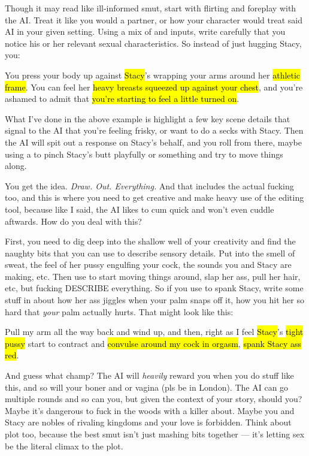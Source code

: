 \documentclass[Avsfag-main.tex]{subfiles}
\begin{document}
Though it may read like ill-informed smut, start with flirting and foreplay with the AI.
Treat it like you would a partner, or how your character would treat said AI in your given setting.
Using a mix of \story and \Do inputs, write carefully that you notice his or her \wi relevant sexual characteristics.
So instead of just hugging Stacy, you:

\begin{storyb}
	\story You press your body up against \hl{Stacy}'s wrapping your arms around her \hl{athletic frame}.
	You can feel her \hl{heavy breasts squeezed up against your chest}, and you're ashamed to admit that \hl{you're starting to feel a little turned on}.
\end{storyb}

What I've done in the above example is highlight a few key scene details that signal to the AI that you're feeling frisky, or want to do a secks with Stacy.
Then the AI will spit out a response on Stacy's behalf, and you roll from there, maybe using a \Do to pinch Stacy's butt playfully or something and try to move things along.

You get the idea.
\emph{Draw. Out. Everything.}
And that includes the actual fucking too, and this is where you need to get creative and make heavy use of the editing tool, because like I said, the AI likes to cum quick and won't even cuddle aftwards.
How do you deal with this?

First, you need to dig deep into the shallow well of your creativity and find the naughty bits that you can use to describe sensory details.
Put into \story the smell of sweat, the feel of her pussy engulfing your cock, the sounds you and Stacy are making, etc. Then use \Do to start moving things around, slap her ass, pull her hair, etc, but fucking DESCRIBE everything.
So if you use \Do to spank Stacy, write some stuff in \Do about how her ass jiggles when your palm snaps off it, how you hit her so hard that \emph{your} palm actually hurts.
That might look like this:

\begin{storyb}
	\Do Pull my arm all the way back and wind up, and then, right as I feel \hl{Stacy}'s \hl{tight pussy} start to contract and \hl{convulse around my cock in orgasm}, \hl{spank Stacy ass red}.
\end{storyb}

And guess what champ?
The AI will \emph{heavily} reward you when you do stuff like this, and so will your boner and or vagina (pls be in London).
The AI can go multiple rounds and so can you, but given the context of your story, should you?
Maybe it's dangerous to fuck in the woods with a killer about.
Maybe you and Stacy are nobles of rivaling kingdoms and your love is forbidden.
Think about plot too, because the best smut isn't just mashing bits together --- it's letting sex be the literal climax to the plot.
\end{document}
